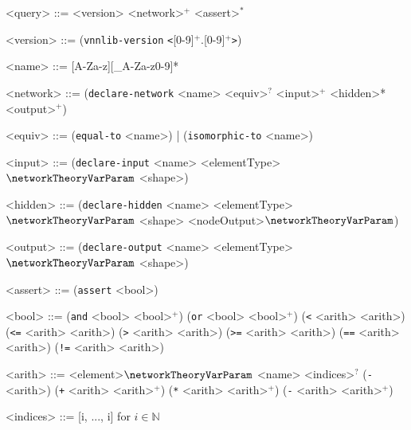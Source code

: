 \begin{grammar}
	<query> ::= <version> <network>$^+$ <assert>$^*$
	
	<version> ::= (\texttt{vnnlib-version} \texttt{\textless}[0-9]$^+$.[0-9]$^+$\texttt{\textgreater})
	
	<name> ::= [A-Za-z][\_A-Za-z0-9]*
		
	<network> ::= (\texttt{declare-network} <name> <equiv>$^?$ <input>$^+$ <hidden>* <output>$^+$)
	
	<equiv> ::= (\texttt{equal-to} <name>) | (\texttt{isomorphic-to} <name>)
	
	<input> ::= (\texttt{declare-input} <name> <elementType>$\networkTheoryVarParam$ <shape>)
	
	<hidden> ::= (\texttt{declare-hidden} <name> <elementType>$\networkTheoryVarParam$ <shape> <nodeOutput>$\networkTheoryVarParam$)
	
	<output> ::= (\texttt{declare-output} <name> <elementType>$\networkTheoryVarParam$ <shape>)
	
	<assert> ::= (\texttt{assert} <bool>)
	
	<bool> ::= (\texttt{and} <bool> <bool>$^+$)
	\alt (\texttt{or} <bool> <bool>$^+$)
	\alt (\texttt{\textless} <arith> <arith>)
	\alt (\texttt{\textless=} <arith> <arith>)
	\alt (\texttt{\textgreater} <arith> <arith>)
	\alt (\texttt{\textgreater=} <arith> <arith>)
	\alt (\texttt{==} <arith> <arith>)
	\alt (\texttt{!=} <arith> <arith>)
	
	<arith> ::= <element>$\networkTheoryVarParam$
	\alt <name> <indices>$^?$
	\alt (\texttt{-} <arith>)
	\alt (\texttt{+} <arith> <arith>$^+$)
	\alt (\texttt{*} <arith> <arith>$^+$)
	\alt (\texttt{-} <arith> <arith>$^+$)
	
	<indices> ::= [i, ..., i] for $i \in \mathbb{N}$
\end{grammar}